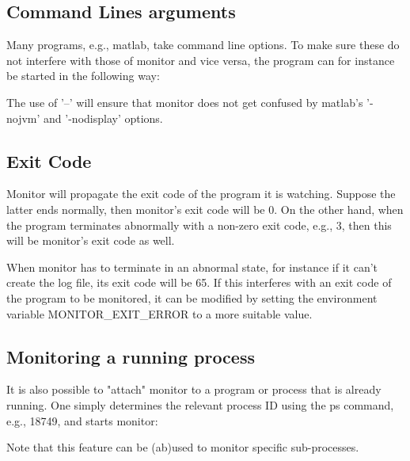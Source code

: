 \subsection{Command Lines arguments}

Many programs, e.g., matlab, take command line options. To make sure these do
not interfere with those of monitor and vice versa, the program can for
instance be started in the following way:

\begin{prompt}
\end{prompt}

The use of '--' will ensure that monitor does not get confused by matlab's '-nojvm' and '-nodisplay' options.

\subsection{Exit Code}

Monitor will propagate the exit code of the program it is watching. Suppose the
latter ends normally, then monitor's exit code will be 0. On the other hand,
when the program terminates abnormally with a non-zero exit code, e.g., 3, then
this will be monitor's exit code as well.

When monitor has to terminate in an abnormal state, for instance if it can't
create the log file, its exit code will be 65. If this interferes with an exit
code of the program to be monitored, it can be modified by setting the
environment variable MONITOR\_EXIT\_ERROR to a more suitable value.

\subsection{Monitoring a running process}

It is also possible to "attach" monitor to a program or process that is already
running. One simply determines the relevant process ID using the ps command,
e.g., 18749, and starts monitor:

\begin{prompt}
\end{prompt}

Note that this feature can be (ab)used to monitor specific sub-processes.

